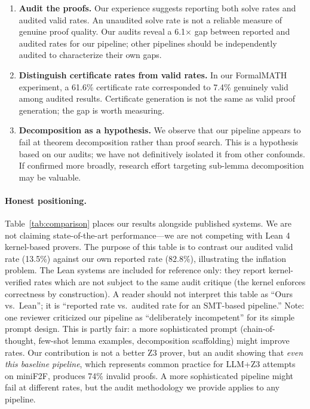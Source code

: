 \documentclass[11pt]{article}
\begin{document}
\begin{enumerate}[leftmargin=*,itemsep=2pt]
    \item \textbf{Audit the proofs.} Our experience suggests reporting both solve rates and audited valid rates. An unaudited solve rate is not a reliable measure of genuine proof quality. Our audits reveal a 6.1$\times$ gap between reported and audited rates for our pipeline; other pipelines should be independently audited to characterize their own gaps.
    \item \textbf{Distinguish certificate rates from valid rates.} In our FormalMATH experiment, a 61.6\% certificate rate corresponded to 7.4\% genuinely valid among audited results. Certificate generation is not the same as valid proof generation; the gap is worth measuring.
    \item \textbf{Decomposition as a hypothesis.} We observe that our pipeline appears to fail at theorem decomposition rather than proof search. This is a hypothesis based on our audits; we have not definitively isolated it from other confounds. If confirmed more broadly, research effort targeting sub-lemma decomposition may be valuable.
\end{enumerate}

\paragraph{Honest positioning.} Table~\ref{tab:comparison} places our results alongside published systems. We are not claiming state-of-the-art performance---we are not competing with Lean 4 kernel-based provers. The purpose of this table is to contrast our audited valid rate (13.5\%) against our own reported rate (82.8\%), illustrating the inflation problem. The Lean systems are included for reference only: they report kernel-verified rates which are not subject to the same audit critique (the kernel enforces correctness by construction). A reader should not interpret this table as ``Ours vs.\ Lean''; it is ``reported rate vs.\ audited rate for an SMT-based pipeline.'' Note: one reviewer criticized our pipeline as ``deliberately incompetent'' for its simple prompt design. This is partly fair: a more sophisticated prompt (chain-of-thought, few-shot lemma examples, decomposition scaffolding) might improve rates. Our contribution is not a better Z3 prover, but an audit showing that \emph{even this baseline pipeline}, which represents common practice for LLM+Z3 attempts on miniF2F, produces 74\% invalid proofs. A more sophisticated pipeline might fail at different rates, but the audit methodology we provide applies to any pipeline.
\end{document}
